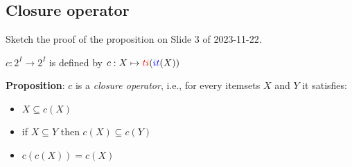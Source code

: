 \documentclass{article}
\newcommand{\Ti}{\textcolor{red}{ti}}
\newcommand{\It}{\textcolor{blue}{it}}
\begin{document}
  \subsection{Closure operator}
  \begin{centerframebox}
    Sketch the proof of the proposition on Slide 3 of 2023-11-22.

    $c: 2^I \to 2^I$ is defined by $c: X \mapsto \Ti(\It(X))$

    \textbf{Proposition}: $c$ is a \textit{closure operator}, i.e., for every itemsets $X$ and $Y$ it satisfies:
    \begin{itemize}
      \item $X \subseteq c(X)$
      \item if $X \subseteq Y$ then $c(X) \subseteq c(Y)$
      \item $c(c(X)) = c(X)$
    \end{itemize}
  \end{centerframebox}
\end{document}
